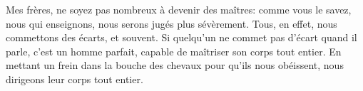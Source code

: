 Mes frères, ne soyez pas nombreux à devenir des maîtres:
	comme vous le savez, nous qui enseignons,
	nous serons jugés plus sévèrement.
Tous, en effet, nous commettons des écarts,
	et souvent.
Si quelqu’un ne commet pas d’écart quand il parle,
	c’est un homme parfait, capable de maîtriser son corps tout entier.
En mettant un frein dans la bouche des chevaux pour qu’ils nous obéissent,
	nous dirigeons leur corps tout entier.
